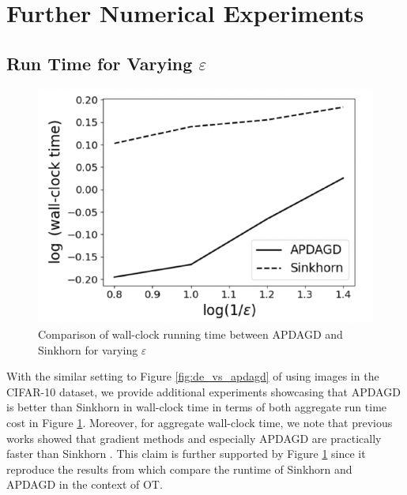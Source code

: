 \section{Further Numerical Experiments}

\subsection{Run Time for Varying $\varepsilon$}
\begin{figure}
    \centering
    \includegraphics[width=0.5\linewidth]{figs/runtime_vary_eps.png}
    \caption{Comparison of wall-clock running time between APDAGD and Sinkhorn for varying $\varepsilon$}
    \label{fig:runtime_for_varying_epsilon}
\end{figure}
With the similar setting to Figure \ref{fig:de_vs_apdagd} of using images in the CIFAR-10 dataset, we provide additional experiments showcasing that APDAGD is better than Sinkhorn in wall-clock time in terms of both aggregate run time cost in Figure \ref{fig:runtime_for_varying_epsilon}. Moreover, for aggregate wall-clock time, we note that previous works showed that gradient methods and especially APDAGD are practically faster than Sinkhorn \cite[Figure 1]{Dvurechensky-2018-Computational}. This claim is further supported by Figure \ref{fig:runtime_for_varying_epsilon} since it reproduce the results from \cite[Figure 1]{Dvurechensky-2018-Computational} which compare the runtime of Sinkhorn and APDAGD in the context of OT. 
